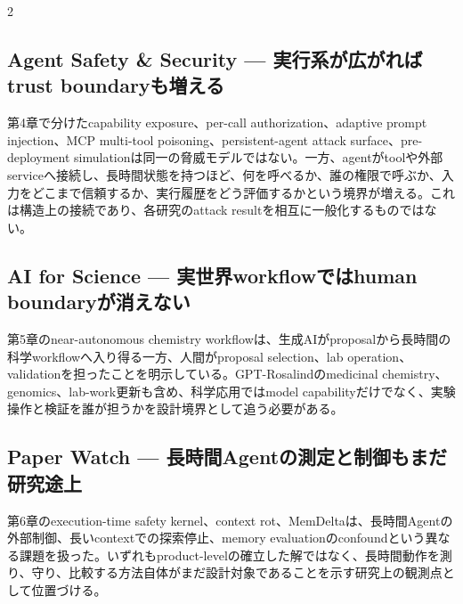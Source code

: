 \begin{multicols}{2}
\subsection{Agent Safety \& Security — 実行系が広がればtrust boundaryも増える}
第4章で分けたcapability exposure、per-call authorization、adaptive prompt injection、MCP multi-tool poisoning、persistent-agent attack surface、pre-deployment simulationは同一の脅威モデルではない。一方、agentがtoolや外部serviceへ接続し、長時間状態を持つほど、何を呼べるか、誰の権限で呼ぶか、入力をどこまで信頼するか、実行履歴をどう評価するかという境界が増える。これは構造上の接続であり、各研究のattack resultを相互に一般化するものではない。 \cite{src-02da0db00c2d,src-cd4b60edfee7,src-6da0c5a88fa4,src-91b06074799d,src-c000018ba1f0}

\subsection{AI for Science — 実世界workflowではhuman boundaryが消えない}
第5章のnear-autonomous chemistry workflowは、生成AIがproposalから長時間の科学workflowへ入り得る一方、人間がproposal selection、lab operation、validationを担ったことを明示している。GPT-Rosalindのmedicinal chemistry、genomics、lab-work更新も含め、科学応用ではmodel capabilityだけでなく、実験操作と検証を誰が担うかを設計境界として追う必要がある。 \cite{src-5ff2f715f1e6,src-ba562226725d}

\subsection{Paper Watch — 長時間Agentの測定と制御もまだ研究途上}
第6章のexecution-time safety kernel、context rot、MemDeltaは、長時間Agentの外部制御、長いcontextでの探索停止、memory evaluationのconfoundという異なる課題を扱った。いずれもproduct-levelの確立した解ではなく、長時間動作を測り、守り、比較する方法自体がまだ設計対象であることを示す研究上の観測点として位置づける。 \cite{src-644589094c65,src-8603fd60d637,src-246f07f416dc}

\end{multicols}
\Needspace{0.34\textheight}
